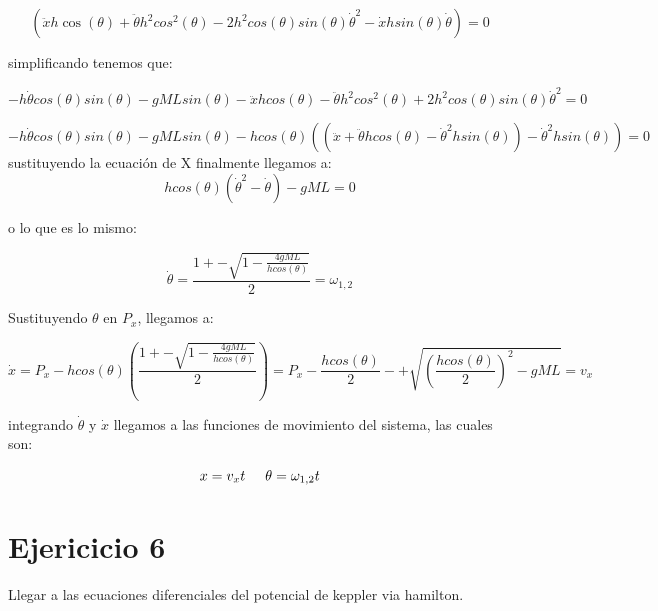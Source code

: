\documentclass[12 pt]{article}
\begin{document}
\begin{equation*}
\left(
\ddot{x}h\cos(\theta)+ \ddot{\theta}h^{2} cos^{2}(\theta) -2h^{2}cos(\theta)sin(\theta)\dot{\theta}^{2}- \dot{x} h sin(\theta) \dot{\theta} \right)= 0
\end{equation*}


simplificando tenemos que:


\begin{equation*}
-h\dot{\theta}cos(\theta)sin(\theta)- gML sin(\theta) - \ddot{x}h cos(\theta)-\ddot{\theta}h^{2}cos^{2}(\theta)+2h^{2} cos(\theta)sin(\theta)\dot{\theta}^{2} = 0
\end{equation*} 

 
 \begin{equation*}
 -h\dot{\theta}cos(\theta)sin(\theta)- gML sin(\theta) - hcos(\theta) \left( (\ddot{x} + \ddot{\theta}h cos(\theta) - \dot{\theta}^{2} hsin(\theta)) - \dot{\theta}^{2} hsin(\theta)\right) = 0 
 \end{equation*}
 sustituyendo la ecuación de X finalmente llegamos a:
\begin{equation*}
hcos(\theta) \left(\dot{\theta}^{2} - \dot{\theta} \right)- gML = 0
\end{equation*}

o lo que es lo mismo: 


\begin{equation*}
\dot{\theta} = \dfrac{1+- \sqrt{1-\frac{4gML}{h cos(\theta)}}}{2} = \omega_{1,2}
\end{equation*}



Sustituyendo $\theta$ en $P_{x}$, llegamos a: 

\begin{equation*}
\dot{x} = P_{x} - h cos(\theta) \left(\dfrac{1+- \sqrt{1-\frac{4gML}{h cos(\theta)}}}{2} \right) = P_{x} - \frac{hcos(\theta)}{2} -+ \sqrt{\left( \frac{hcos(\theta)}{2}\right) ^{2} - gML}  = v_{x}
\end{equation*}

integrando $\dot{\theta}$ y $\dot{x}$ llegamos a las funciones de movimiento del sistema, las cuales son:

\begin{equation*}
x = v_{x} t \hspace{0.5 cm} \theta = \omega_{1,2} t
\end{equation*}


\section*{Ejericicio 6}
Llegar a las ecuaciones diferenciales del potencial de keppler via hamilton.
\end{document}
